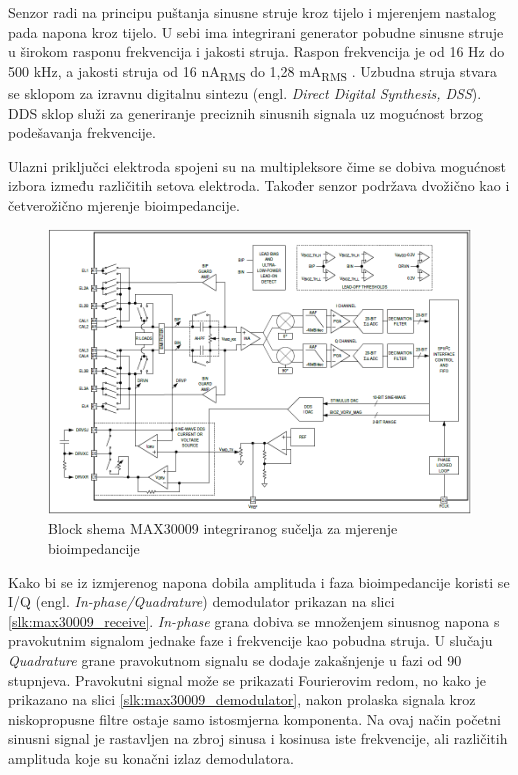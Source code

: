\documentclass[../diplomski_rad.tex]{subfiles}
\begin{document}
Senzor radi na principu puštanja sinusne struje kroz tijelo i mjerenjem nastalog pada napona kroz tijelo. 
U sebi ima integrirani generator pobudne sinusne struje u širokom rasponu frekvencija i jakosti struja. 
Raspon frekvencija je od 16 Hz do 500 kHz, a jakosti struja od 16 nA\textsubscript{RMS} do 1,28 mA\textsubscript{RMS} \cite{max30009}.
Uzbudna struja stvara se sklopom za izravnu digitalnu sintezu (engl. \textit{Direct Digital Synthesis, DSS}). 
DDS sklop služi za generiranje preciznih sinusnih signala uz mogućnost brzog podešavanja frekvencije.  

Ulazni priključci elektroda spojeni su na multipleksore čime se dobiva mogućnost izbora 
između različitih setova elektroda. Također senzor podržava dvožično kao i četverožično mjerenje bioimpedancije.

\begin{figure}[htb]
    \centering
    \includegraphics[width=1\textwidth]{Figures/max30009_bioz.png} 
    \caption{Block shema MAX30009 integriranog sučelja za mjerenje bioimpedancije \cite{max30009_datasheet}}
    \label{slk:max30009_bioz}
\end{figure}

Kako bi se iz izmjerenog napona dobila amplituda i faza bioimpedancije koristi se I/Q (engl. \textit{In-phase/Quadrature}) 
demodulator prikazan na slici \ref{slk:max30009_receive}. 
\textit{In-phase} grana dobiva se množenjem sinusnog napona s pravokutnim signalom jednake faze i frekvencije kao pobudna struja.
U slučaju \textit{Quadrature} grane pravokutnom signalu se dodaje zakašnjenje u fazi od 90 stupnjeva.  
Pravokutni signal može se prikazati Fourierovim redom, no kako je prikazano na slici \ref{slk:max30009_demodulator}, 
nakon prolaska signala kroz niskopropusne filtre ostaje samo istosmjerna komponenta. 
Na ovaj način početni sinusni signal je rastavljen na zbroj sinusa i kosinusa iste frekvencije, ali različitih amplituda koje su 
konačni izlaz demodulatora.
\end{document}
